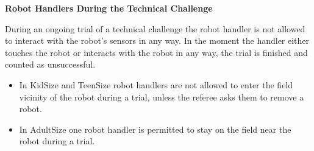 \bigskip

{\bfseries Robot Handlers During the Technical Challenge}

\headlinebox

During an ongoing trial of a technical challenge the robot handler is not allowed to interact with the robot's sensors in any way. In the moment the handler either touches the robot or interacts with the robot in any way, the trial is finished and counted as unsuccessful.

\begin{itemize}
\item In KidSize and TeenSize robot handlers are not allowed to enter the field vicinity of the robot during a trial, unless the referee asks them to remove a robot.
\item In AdultSize one robot handler is permitted to stay on the field near the robot during a trial.
\end{itemize}